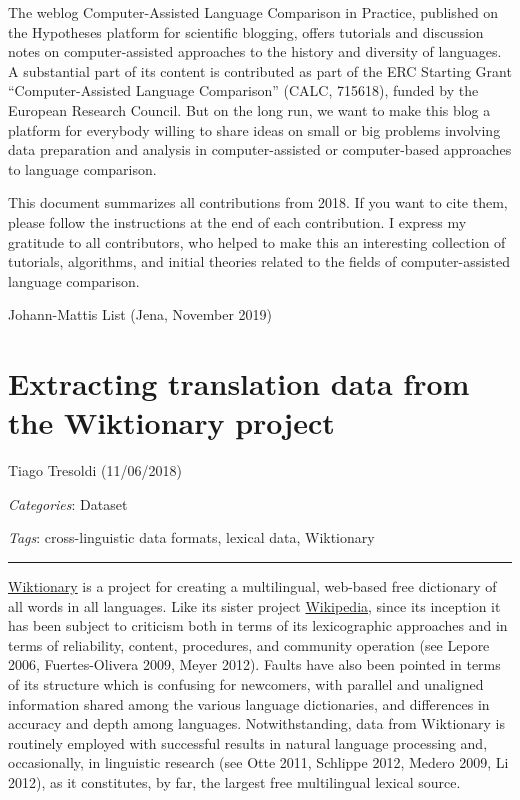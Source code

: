 \documentclass[
  a4paper,
  14pt,
  oneside,
  tablecaptionabove
]{scrbook}
\begin{document}
The weblog Computer-Assisted Language Comparison in Practice, published on the Hypotheses platform
for scientific blogging, offers tutorials and discussion notes on computer-assisted approaches to the
history and diversity of languages. A substantial part of its content is contributed as part of the
ERC Starting Grant ``Computer-Assisted Language Comparison'' (CALC, 715618), funded by the European
Research Council. But on the long run, we want to make this blog a platform for everybody willing to
share ideas on small or big problems involving data preparation and analysis in computer-assisted
or computer-based approaches to language comparison.

This document summarizes all contributions from 2018. If you want to cite them, please follow the
instructions at the end of each contribution. I express my gratitude to all contributors, who helped
to make this an interesting collection of tutorials, algorithms, and initial theories
related to the fields of computer-assisted language comparison.

\begin{flushright}
\noindent Johann-Mattis List (Jena, November 2019)
\end{flushright}

\newpage
\section*{Extracting translation data from the Wiktionary project}

Tiago Tresoldi (11/06/2018)

\emph{Categories}: Dataset

\emph{Tags}: cross-linguistic data formats, lexical data, Wiktionary

\begin{center}\rule{0.5\linewidth}{1pt}\end{center}

\href{https://wiktionary.org}{Wiktionary} is a project for creating a
multilingual, web-based free dictionary of all words in all languages.
Like its sister project \href{https://wikipedia.org}{Wikipedia}, since
its inception it has been subject to criticism both in terms of its
lexicographic approaches and in terms of reliability, content,
procedures, and community operation (see Lepore 2006, Fuertes-Olivera
2009, Meyer 2012). Faults have also been pointed in terms of its
structure which is confusing for newcomers, with parallel and unaligned
information shared among the various language dictionaries, and
differences in accuracy and depth among languages. Notwithstanding, data
from Wiktionary is routinely employed with successful results in natural
language processing and, occasionally, in linguistic research (see Otte
2011, Schlippe 2012, Medero 2009, Li 2012), as it constitutes, by far,
the largest free multilingual lexical source.
\end{document}
